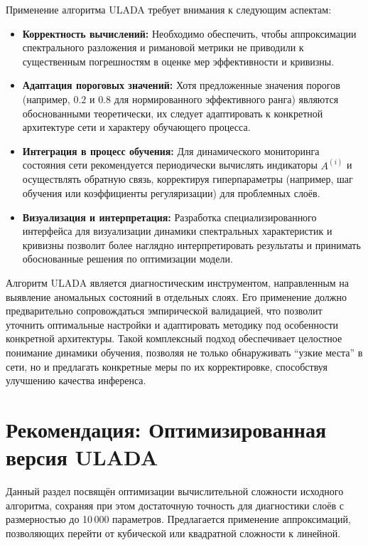 \documentclass[a4paper,12pt]{article}
\begin{document}
Применение алгоритма ULADA требует внимания к следующим аспектам:
\begin{itemize}[leftmargin=1.5cm]
\item \textbf{Корректность вычислений:} Необходимо обеспечить, чтобы аппроксимации спектрального разложения и римановой метрики не приводили к существенным погрешностям в оценке мер эффективности и кривизны.
\item \textbf{Адаптация пороговых значений:} Хотя предложенные значения порогов (например, \(0.2\) и \(0.8\) для нормированного эффективного ранга) являются обоснованными теоретически, их следует адаптировать к конкретной архитектуре сети и характеру обучающего процесса.
\item \textbf{Интеграция в процесс обучения:} Для динамического мониторинга состояния сети рекомендуется периодически вычислять индикаторы \( A^{(i)} \) и осуществлять обратную связь, корректируя гиперпараметры (например, шаг обучения или коэффициенты регуляризации) для проблемных слоёв.
\item \textbf{Визуализация и интерпретация:} Разработка специализированного интерфейса для визуализации динамики спектральных характеристик и кривизны позволит более наглядно интерпретировать результаты и принимать обоснованные решения по оптимизации модели.
\end{itemize}

Алгоритм ULADA является диагностическим инструментом, направленным на выявление аномальных состояний в отдельных слоях. Его применение должно предварительно сопровождаться эмпирической валидацией, что позволит уточнить оптимальные настройки и адаптировать методику под особенности конкретной архитектуры. Такой комплексный подход обеспечивает целостное понимание динамики обучения, позволяя не только обнаруживать ``узкие места'' в сети, но и предлагать конкретные меры по их корректировке, способствуя улучшению качества инференса.

\bigskip

\section{Рекомендация: Оптимизированная версия ULADA}

Данный раздел посвящён оптимизации вычислительной сложности исходного алгоритма, сохраняя при этом достаточную точность для диагностики слоёв с размерностью до 10\,000 параметров. Предлагается применение аппроксимаций, позволяющих перейти от кубической или квадратной сложности к линейной.
\end{document}
